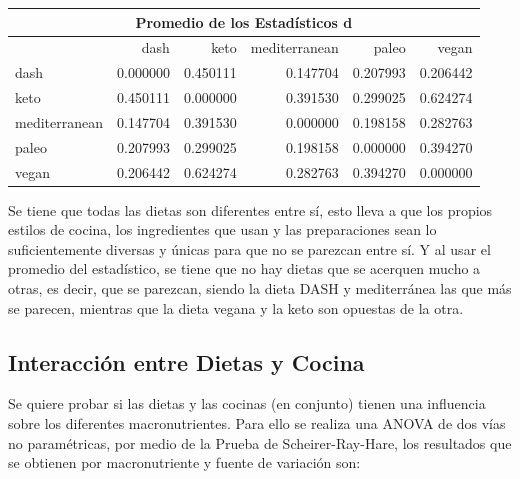 \documentclass[12pt,a4paper]{article}
\begin{document}
{{            \begin{center}
                \begin{tabular}{lrrrrr}
                \toprule
                    \multicolumn{6}{c}{Promedio de los Estadísticos d} \\
                \midrule
                    & dash & keto & mediterranean & paleo & vegan \\
                \midrule
                    dash          & 0.000000 & 0.450111 & 0.147704 & 0.207993 & 0.206442 \\
                    keto          & 0.450111 & 0.000000 & 0.391530 & 0.299025 & 0.624274 \\
                    mediterranean & 0.147704 & 0.391530 & 0.000000 & 0.198158 & 0.282763 \\
                    paleo         & 0.207993 & 0.299025 & 0.198158 & 0.000000 & 0.394270 \\
                    vegan         & 0.206442 & 0.624274 & 0.282763 & 0.394270 & 0.000000 \\
                \bottomrule
                \end{tabular}
            \end{center}

            Se tiene que todas las dietas son diferentes entre sí, esto lleva a que 
            los propios estilos de cocina, los ingredientes que usan y las preparaciones 
            sean lo suficientemente diversas y únicas para que no se parezcan entre sí. 
            Y al usar el promedio del estadístico, se tiene que no hay dietas que se acerquen 
            mucho a otras, es decir, que se parezcan, siendo la dieta DASH y mediterránea las 
            que más se parecen, mientras que la dieta vegana y la keto son opuestas de la otra. 
        }

        \subsection{Interacción entre Dietas y Cocina}
        {
            Se quiere probar si las dietas y las cocinas (en conjunto) tienen una influencia 
            sobre los diferentes macronutrientes. Para ello se realiza una ANOVA de dos vías 
            no paramétricas, por medio de la Prueba de Scheirer-Ray-Hare, los resultados que 
            se obtienen por macronutriente y fuente de variación son:

}}
\end{document}
